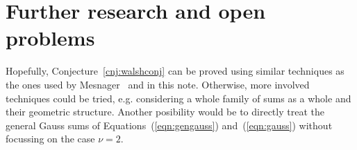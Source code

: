 \documentclass[11pt,a4paper]{article}
\makeatletter
\newcommand{\eg}{e.g.\@\xspace}
\makeatother
\begin{document}
\section{Further research and open problems}

Hopefully, Conjecture~\ref{cnj:walshconj} can be proved using
similar techniques
as the ones used by Mesnager~\cite{DBLP:journals/dcc/Mesnager11}
and in this note.
Otherwise, more involved techniques could be tried, \eg considering a whole
family of sums as a whole and their geometric structure.
Another posibility would be to directly treat the general Gauss sums of
Equations~(\ref{eqn:gengauss}) and~(\ref{eqn:gauss}) without focussing
on the case $\nu = 2$.



\end{document}
